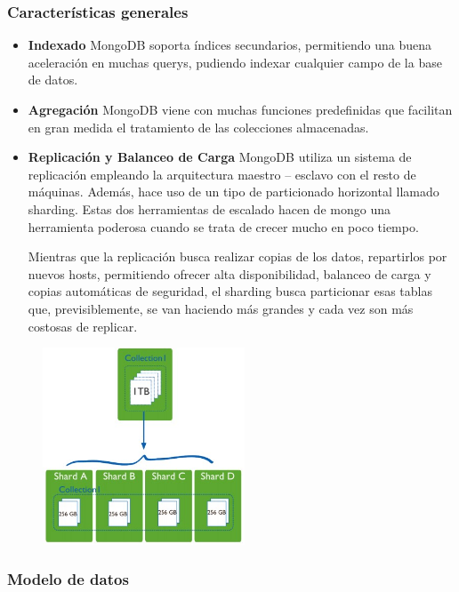 \documentclass[preprint,12pt]{elsarticle}
\begin{document}
\subsubsection{\textbf{Características generales}}
\begin{itemize}
\item 
\textbf{Indexado}\newline
MongoDB soporta índices secundarios, permitiendo una buena aceleración en muchas querys, pudiendo indexar cualquier campo de la base de datos.
\item 
\textbf{Agregación}\newline
MongoDB viene con muchas funciones predefinidas que facilitan en gran medida el tratamiento de las colecciones almacenadas.
\item
\textbf{Replicación y Balanceo de Carga}\newline
MongoDB utiliza un sistema de replicación empleando la arquitectura maestro – esclavo con el resto de máquinas. Además, hace uso de un tipo de particionado horizontal llamado sharding. Estas dos herramientas de escalado hacen de mongo una herramienta poderosa cuando se trata de crecer mucho en poco tiempo.

Mientras que la replicación busca realizar copias de los datos, repartirlos por nuevos hosts, permitiendo ofrecer alta disponibilidad, balanceo de carga y copias automáticas de seguridad, el sharding busca particionar esas tablas que, previsiblemente, se van haciendo más grandes y cada vez son más costosas de replicar.
\end{itemize}
 \cite{MongoDB}

\begin{figure}[htb]
	\begin{center}
		\includegraphics[width=6cm]{./IMAGENES/img01} %
	\end{center}
\end{figure}

\subsubsection{\textbf{Modelo de datos}}
\end{document}
